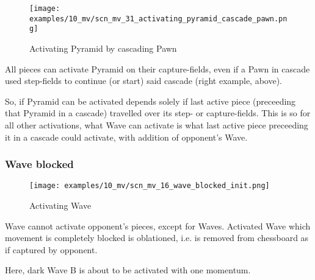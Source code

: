 \clearpage %

\vspace*{-2.1\baselineskip}
\noindent
\begin{figure}[!h]
\texttt{[image: examples/10\_mv/scn\_mv\_31\_activating\_pyramid\_cascade\_pawn.png]}
\vspace*{-1.3\baselineskip}
\caption{Activating Pyramid by cascading Pawn}
\label{fig:scn_mv_31_activating_pyramid_cascade_pawn}
\end{figure}

\vspace*{-0.3\baselineskip}
All pieces can activate Pyramid on their capture-fields, even if a Pawn in cascade used
step-fields to continue (or start) said cascade (right example, above).

So, if Pyramid can be activated depends solely if last active piece (preceeding that Pyramid
in a cascade) travelled over its step- or capture-fields. This is so for all other activations,
what Wave can activate is what last active piece preceeding it in a cascade could activate,
with addition of opponent's Wave.

\clearpage %

\subsubsection*{Wave blocked}

\vspace*{-1.4\baselineskip}
\noindent
\begin{figure}[h]
\texttt{[image: examples/10\_mv/scn\_mv\_16\_wave\_blocked\_init.png]}
\caption{Activating Wave}
\label{fig:scn_mv_16_wave_blocked_init}
\end{figure}

Wave cannot activate opponent's pieces, except for Waves. Activated Wave which movement
is completely blocked is oblationed, i.e. is removed from chessboard as if captured by
opponent.

Here, dark Wave B is about to be activated with one momentum.

\clearpage %

